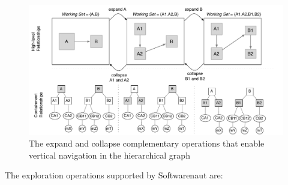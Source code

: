 \documentclass[preprint,12pt]{elsarticle}
\begin{document}
\begin{figure}[ht]
\begin{center}
\includegraphics[width=\linewidth]{SnautSequence}
\caption{The expand and collapse complementary operations that enable vertical navigation in the hierarchical graph}
\label{}
\end{center}
\end{figure}

The exploration operations supported by Softwarenaut are:
\end{document}
